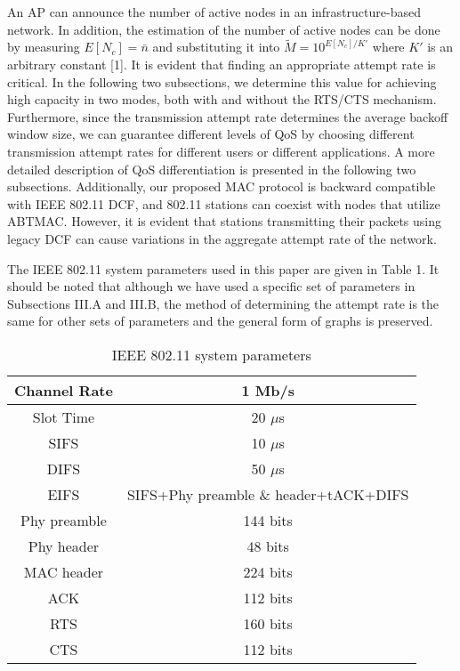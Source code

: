 \documentclass[10pt,twocolumn,oneside,submit]{JCNtran}
\begin{document}
An AP can announce the number of active nodes in an infrastructure-based network. In addition, the estimation of the number of active nodes can be done by measuring $E[N_c ]=\bar n$ and substituting it into $\tilde M=10^{E[N_c]/K'}$ where $K'$ is an arbitrary constant [1]. It is evident that finding an appropriate attempt rate is critical. In the following two subsections, we determine this value for achieving high capacity in two modes, both with and without the RTS/CTS mechanism. Furthermore, since the transmission attempt rate determines the average backoff window size, we can guarantee different levels of QoS by choosing different transmission attempt rates for different users or different applications. A more detailed description of QoS differentiation is presented in the following two subsections. Additionally, our proposed MAC protocol is backward compatible with IEEE 802.11 DCF, and 802.11 stations can coexist with nodes that utilize ABTMAC. However, it is evident that stations transmitting their packets using legacy DCF can cause variations in the aggregate attempt rate of the network.

The IEEE 802.11 system parameters used in this paper are given in Table 1. It should be noted that although we have used a specific set of parameters in Subsections III.A and III.B, the method of determining the attempt rate is the same for other sets of parameters and the general form of graphs is preserved.

\begin{table}
\caption{IEEE 802.11 system parameters}
\label{tab:tab1}
\begin{center}
{\small \begin{tabular}{|c|c|}\hline
Channel Rate & 1 Mb/s\\ \hline
Slot Time & 20 $\mu $s\\ \hline
SIFS & 10 $\mu $s\\ \hline
DIFS & 50 $\mu $s\\ \hline
EIFS & SIFS+Phy preamble \& header+tACK+DIFS\\ \hline
Phy preamble & 144 bits\\ \hline
Phy header & 48 bits\\ \hline
MAC header & 224 bits\\ \hline
ACK & 112 bits\\ \hline
RTS & 160 bits\\ \hline
CTS & 112 bits\\ \hline
\end{tabular}}
\end{center}
\end{table}
\end{document}
